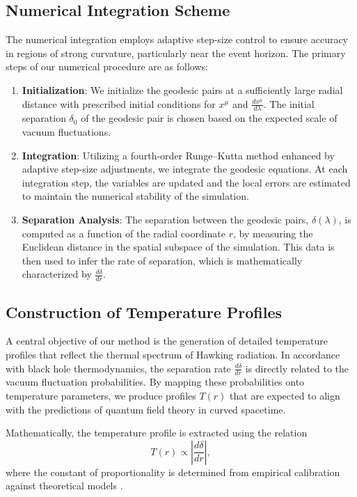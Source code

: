 \documentclass{article}\usepackage[utf8]{inputenc} %
\begin{document}
\subsection{Numerical Integration Scheme}
The numerical integration employs adaptive step-size control to ensure accuracy in regions of strong curvature, particularly near the event horizon. The primary steps of our numerical procedure are as follows:
\begin{enumerate}
    \item \textbf{Initialization}: We initialize the geodesic pairs at a sufficiently large radial distance with prescribed initial conditions for $x^{\mu}$ and $\frac{dx^{\mu}}{d\lambda}$. The initial separation $\delta_0$ of the geodesic pair is chosen based on the expected scale of vacuum fluctuations.
    \item \textbf{Integration}: Utilizing a fourth-order Runge–Kutta method enhanced by adaptive step-size adjustments, we integrate the geodesic equations. At each integration step, the variables are updated and the local errors are estimated to maintain the numerical stability of the simulation.
    \item \textbf{Separation Analysis}: The separation between the geodesic pairs, $\delta(\lambda)$, is computed as a function of the radial coordinate $r$, by measuring the Euclidean distance in the spatial subspace of the simulation. This data is then used to infer the rate of separation, which is mathematically characterized by $\frac{d\delta}{dr}$.
\end{enumerate}

\subsection{Construction of Temperature Profiles}
A central objective of our method is the generation of detailed temperature profiles that reflect the thermal spectrum of Hawking radiation. In accordance with black hole thermodynamics, the separation rate $\frac{d\delta}{dr}$ is directly related to the vacuum fluctuation probabilities. By mapping these probabilities onto temperature parameters, we produce profiles $T(r)$ that are expected to align with the predictions of quantum field theory in curved spacetime.

Mathematically, the temperature profile is extracted using the relation
\begin{equation}
T(r) \propto \left| \frac{d\delta}{dr}\right|, 
\end{equation}
where the constant of proportionality is determined from empirical calibration against theoretical models \cite{Unruh1976}. 
\end{document}
